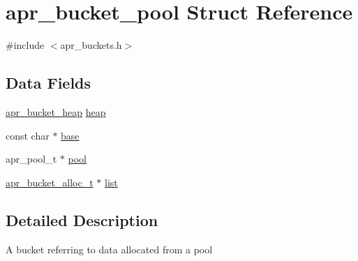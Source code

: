 \hypertarget{structapr__bucket__pool}{\section{apr\-\_\-bucket\-\_\-pool Struct Reference}
\label{structapr__bucket__pool}
}


{\ttfamily \#include $<$apr\-\_\-buckets.\-h$>$}

\subsection*{Data Fields}
\begin{DoxyCompactItemize}
\item 
\hyperlink{structapr__bucket__heap}{apr\-\_\-bucket\-\_\-heap} \hyperlink{structapr__bucket__pool_a0fe0b0dedea28fb1ed0a1a0f42338225}{heap}
\item 
const char $\ast$ \hyperlink{structapr__bucket__pool_a9ee5297361ba548a20c3aa626a37c068}{base}
\item 
apr\-\_\-pool\-\_\-t $\ast$ \hyperlink{structapr__bucket__pool_af55591a1e7f3b097e7c271683bc80968}{pool}
\item 
\hyperlink{group___a_p_r___util___bucket___brigades_ga9a30babfeb6e290db124d8f9b69e49e4}{apr\-\_\-bucket\-\_\-alloc\-\_\-t} $\ast$ \hyperlink{structapr__bucket__pool_a651aa0c18658342daf72ff86680bfaca}{list}
\end{DoxyCompactItemize}


\subsection{Detailed Description}
A bucket referring to data allocated from a pool 

